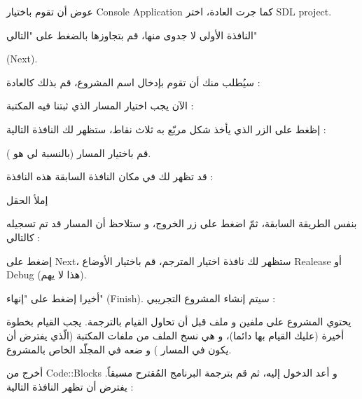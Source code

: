 عوض أن تقوم باختيار 
\textenglish{Console Application}
كما جرت العادة، اختر 
\textenglish{SDL project}.


النافذة الأولى لا جدوى منها، قم بتجاوزها بالضغط على "التالي"

(\textenglish{Next}).


سيُطلب منك أن تقوم بإدخال اسم المشروع، قم بذلك كالعادة :


الآن يجب اختيار المسار الذي ثبتنا فيه المكتبة :


إظغط على الزر الذي يأخذ شكل مربّع به ثلاث نقاط، ستظهر لك النافذة التالية :


قم باختيار المسار (بالنسبة لي هو
).

قد تظهر لك في مكان النافذة السابقة هذه النافذة :


إملأ الحقل

بنفس الطريقة السابقة، ثمّ اضغط على زر الخروج، و ستلاحظ أن المسار قد تم تسجيله كالتالي :


إضغط على
\textenglish{Next}،
 ستظهر لك نافذة اختيار المترجم، قم باختيار الأوضاع
\textenglish{Realease}
أو
\textenglish{Debug}
(هذا لا يهم).

أخيرا إضغط على "إنهاء"
(\textenglish{Finish}).
 سيتم إنشاء المشروع التجريبي :
 

يحتوي المشروع على ملفين 
و ملف
قبل أن تحاول القيام بالترجمة. يجب القيام بخطوة أخيرة (عليك القيام بها دائما)، و هي نسخ الملف 
من ملفات المكتبة (الّذي يفترض أن يكون في المسار 
)
و ضعه في المجلّد الخاص بالمشروع.


أخرج من 
\textenglish{Code::Blocks}
و أعد الدخول إليه، ثم قم بترجمة البرنامج المُقترح مسبقاً. يفترض أن تظهر النافذة التالية :

